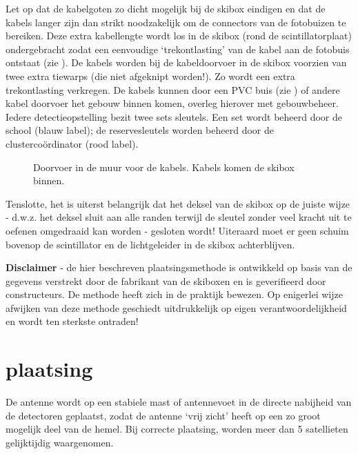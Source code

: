 Let op dat de kabelgoten zo dicht mogelijk bij de skibox eindigen en dat
de kabels langer zijn dan strikt noodzakelijk om de connectors van de
fotobuizen te bereiken. Deze extra kabellengte wordt los in de skibox
(rond de scintillatorplaat) ondergebracht zodat een eenvoudige
‘trekontlasting’ van de kabel aan de fotobuis ontstaat (zie
). De kabels worden bij de kabeldoorvoer
in de skibox voorzien van twee extra tiewarps (die niet afgeknipt
worden!). Zo wordt een extra trekontlasting verkregen. De kabels kunnen
door een PVC buis (zie ) of andere kabel
doorvoer het gebouw binnen komen, overleg hierover met gebouwbeheer.
Iedere detectieopstelling bezit twee sets sleutels. Een set wordt
beheerd door de school (blauw label); de reservesleutels worden beheerd
door de clustercoördinator (rood label).

\begin{figure}
    \centering
    \caption{Doorvoer in de muur voor de kabels. Kabels komen de skibox
             binnen.}
\end{figure}

Tenslotte, het is uiterst belangrijk dat het deksel van de skibox op de
juiste wijze - d.w.z. het deksel sluit aan alle randen terwijl de
sleutel zonder veel kracht uit te oefenen omgedraaid kan worden -
gesloten wordt! Uiteraard moet er geen schuim bovenop de
scintillator en de lichtgeleider in de skibox achterblijven.

\textbf{Disclaimer} - de hier beschreven plaatsingsmethode is ontwikkeld
op basis van de gegevens verstrekt door de fabrikant van de skiboxen en
is geverifieerd door constructeurs. De methode heeft zich in de praktijk
bewezen. Op enigerlei wijze afwijken van deze methode geschiedt
uitdrukkelijk op eigen verantwoordelijkheid en wordt ten sterkste
ontraden!


\section{\gps plaatsing}

De \gps antenne wordt op een stabiele mast of antennevoet in de directe
nabijheid van de detectoren geplaatst, zodat de antenne ‘vrij
zicht’ heeft op een zo groot mogelijk deel van de hemel. Bij correcte
plaatsing, worden meer dan 5 satellieten gelijktijdig waargenomen.

